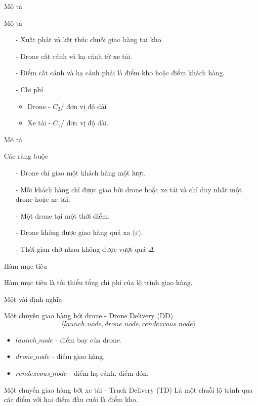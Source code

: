 \documentclass[compress]{beamer}
\begin{document}
\begin{frame}{Mô tả}
\begin{block}{Mô tả}
\begin{itemize}
\item[-] Xuất phát và kết thúc chuỗi giao hàng tại kho.
\item[-] Drone cất cánh và hạ cánh từ xe tải.
\item[-] Điểm cất cánh và hạ cánh phải là điểm kho hoặc điểm khách hàng.
\item[-] Chi phí \begin{itemize}
\item Drone - $C_2$/ đơn vị độ dài
\item Xe tải - $C_1$/ đơn vị độ dài.
\end{itemize}
\end{itemize}
\end{block}
\end{frame}
\begin{frame}{Mô tả}


\begin{block}{Các ràng buộc}
\begin{itemize}

\item[-] Drone chỉ giao một khách hàng một lượt.
\item[-] Mỗi khách hàng chỉ được giao bởi drone hoặc xe tải và chỉ duy nhất một drone hoặc xe tải.
\item[-] Một drone tại một thời điểm.
\item[-] Drone không được giao hàng quá xa ($\varepsilon$).
\item[-] Thời gian chờ nhau không được vượt quá $\Delta$.


\end{itemize}
\end{block}

\begin{block}{Hàm mục tiêu}

Hàm mục tiêu là tối thiểu tổng chi phí của lộ trình giao hàng.
\end{block}
\end{frame}
\begin{frame}{Một vài định nghĩa}
\begin{block}{Một chuyến giao hàng bới drone - Drone Delivery (DD)}
$$\langle launch\_node, drone\_node, rendezvous\_node \rangle$$
\begin{itemize}
\item $launch\_node$ - điểm bay của drone.
\item $drone\_node$ - điểm giao hàng.
\item $rendezvous\_node$ - điểm hạ cánh, điểm đón.
\end{itemize}
\end{block}
\begin{block}{Một chuyến giao hàng bởi xe tải - Truck Delivery (TD)}
Là một chuỗi lộ trình qua các điểm với hai điểm đầu cuối là điểm kho. 

\end{block}
\end{frame}
\end{document}
